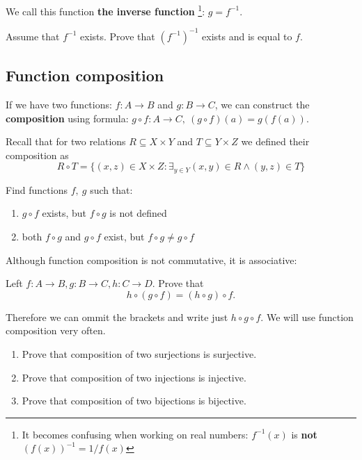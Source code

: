 \noindent We call this function \textbf{the inverse function}
\footnote{It becomes confusing when working on real numbers: $f^{-1}(x)$ is
\textbf{not} $(f(x))^{-1}=1/f(x)$}: $g=f^{-1}.$

\begin{prob}
	Assume that $f^{-1}$ exists. Prove that $(f^{-1})^{-1}$ exists and is equal to $f$.
\end{prob}

\subsection{Function composition}
If we have two functions: $f:A\to B$ and $g: B\to C$, we can construct the \textbf{composition} using formula:
$g\circ f: A\to C,~(g\circ f)(a) = g(f(a)).$

\begin{exercise}
  Recall that for two relations $R\subseteq X\times Y$ and $T\subseteq Y\times Z$ we defined their composition as $$R\circ T=\{(x,z)\in X\times Z : \exists_{y\in Y} (x,y)\in R \wedge (y,z)\in T\}$$
\end{exercise}

\begin{prob}
	Find functions $f,~g$ such that:
	\begin{enumerate}
		\item $g\circ f$ exists, but $f\circ g$ is not defined
		\item both $f\circ g$ and $g\circ f$ exist, but $f\circ g\neq g\circ f$
	\end{enumerate}
\end{prob}

\noindent Although function composition is not commutative, it is associative:
\begin{prob}
	Left $f:A\to B, g: B\to C, h: C\to D$. Prove that
	$$h\circ (g\circ f) = (h\circ g)\circ f.$$
\end{prob}
Therefore we can ommit the brackets and write just $h\circ g\circ f.$ We will use function composition very
often.

\begin{prob}
    \begin{enumerate}
	   \item Prove that composition of two surjections is surjective.
	   \item Prove that composition of two injections is injective.
	   \item Prove that composition of two bijections is bijective.
    \end{enumerate}
\end{prob}

